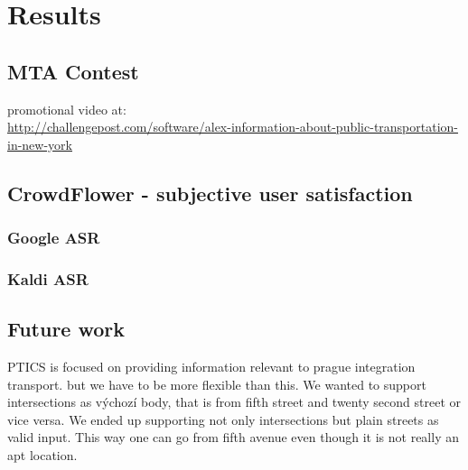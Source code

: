 \chapter{Results}


\section{MTA Contest}

promotional video at: \\
\url{http://challengepost.com/software/alex-information-about-public-transportation-in-new-york}

\section{CrowdFlower - subjective user satisfaction}



\subsection{Google ASR}
\subsection{Kaldi ASR}


\section{Future work}






PTICS is focused on providing information relevant to prague integration transport. but we have to be more flexible than this. We wanted to support intersections as výchozí body, that is from fifth street and twenty second street or vice versa. We ended up supporting not only intersections but plain streets as valid input. This way one can go from fifth avenue even though it is not really an apt location.



